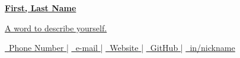 

\begin{center}
    \textbf{\huge \underline{First, Last Name}}
\end{center}

\begin{center}
    \underline{A word to describe yourself.}
\end{center}

\begin{center}
    \href{tel:+886-}{
        \underline{
            \raisebox{0.0\height}{\footnotesize \faPhone}\
            {Phone Number}
        }
    } |
    \href{mailto:}{
        \underline{
            \raisebox{0.0\height}{\footnotesize \faEnvelope}\
            {e-mail}
        }
    } |
    \href{https://www.1chooo.com/}{
        \underline{
            \raisebox{0.0\height}{\footnotesize \faGlobe}\
            {Website}
        }
    } |
    \href{https://github.com/1chooo}{
        \underline{
            \raisebox{0.0\height}{\footnotesize \faGithub}\
            {GitHub}
        }
    } |
    \href{https://www.linkedin.com/in/1chooo/}{
        \underline{
            \raisebox{0.0\height}{\footnotesize \faLinkedin}\
            {in/nickname}
        }
    }
\end{center}
